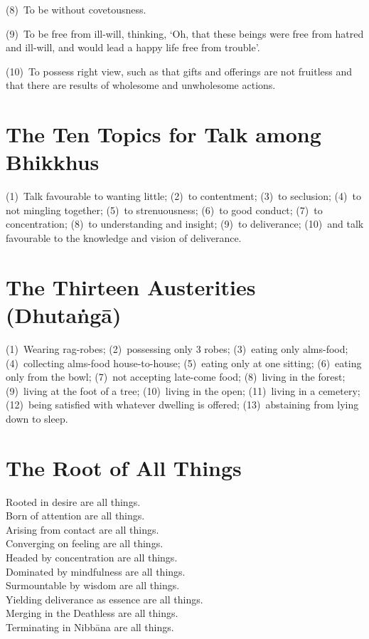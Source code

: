 (8)~To be without covetousness.

(9)~To be free from ill-will, thinking, ‘Oh, that these beings were free from hatred
and ill-will, and would lead a happy life free from trouble’.

(10)~To possess right view, such as that gifts and offerings are not fruitless and
that there are results of wholesome and unwholesome actions.


\ifhandbookedition
\vspace*{-\baselineskip}
\fi

\section*{The Ten Topics for Talk among Bhikkhus}

(1)~Talk favourable to wanting little;
(2)~to contentment;
(3)~to seclusion;
(4)~to not mingling together;
(5)~to strenuousness;
(6)~to good conduct;
(7)~to concentration;
(8)~to understanding and insight;
(9)~to deliverance;
(10)~and talk favourable to the knowledge and vision of deliverance.


\ifhandbookedition
\vspace*{-\baselineskip}
\fi

\section*{The Thirteen Austerities (Dhutaṅgā)}

(1)~Wearing rag-robes;
(2)~possessing only 3 robes;
(3)~eating only alms-food;
(4)~collecting alms-food house-to-house;
(5)~eating only at one sitting;
(6)~eating only from the bowl;
(7)~not accepting late-come food;
(8)~living in the forest;
(9)~living at the foot of a tree;
(10)~living in the open;
(11)~living in a cemetery;
(12)~being satisfied with whatever dwelling is offered;
(13)~abstaining from lying down to sleep.


\ifhandbookedition
\clearpage
\fi

\section*{The Root of All Things}

Rooted in desire are all things.\\
Born of attention are all things.\\
Arising from contact are all things.\\
Converging on feeling are all things.\\
Headed by concentration are all things.\\
Dominated by mindfulness are all things.\\
Surmountable by wisdom are all things.\\
Yielding deliverance as essence are all things.\\
Merging in the Deathless are all things.\\
Terminating in Nibbāna are all things.


